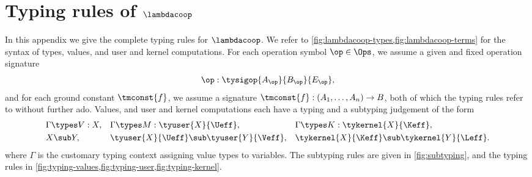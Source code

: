 
\section{Typing rules of $\lambdacoop$}
\label{sec:typing-rules}

In this appendix we give the complete typing rules for $\lambdacoop$. We refer to
\cref{fig:lambdacoop-types,fig:lambdacoop-terms} for the syntax of types, values, 
and user and kernel computations.
%
For each operation symbol $\op \in \Ops$, we assume a given and fixed operation signature
%
\begin{equation*}
  \op : \tysigop{A_\op}{B_\op}{E_\op},
\end{equation*}
%
and for each ground constant $\tmconst{f}$, we assume 
a signature $\tmconst{f} : (A_1,\ldots,A_n) \to B$, 
both of which the typing rules refer to without further ado.
%
Values, and user and kernel computations each have a typing and a subtyping judgement of the
form
%
\begin{align*}
  &\Gamma \types V : X,
& &\Gamma \types M : \tyuser{X}{\Ueff},
& &\Gamma \types K : \tykernel{X}{\Keff},\\
  &X \sub Y,
& &\tyuser{X}{\Ueff} \sub \tyuser{Y}{\Veff},
& &\tykernel{X}{\Keff} \sub \tykernel{Y}{\Leff}.
\end{align*}
%
where $\Gamma$ is the customary typing context assigning value types to variables. 
The subtyping rules are given in \cref{fig:subtyping}, and the 
typing rules in \cref{fig:typing-values,fig:typing-user,fig:typing-kernel}.


